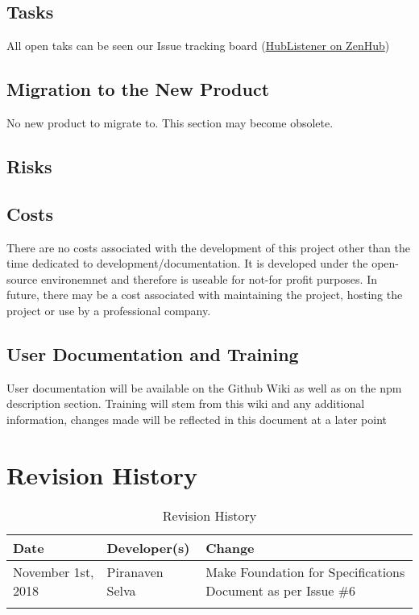 \documentclass{article}
\begin{document}
\subsection{Tasks}
All open taks can be seen our Issue tracking board (\href{ https://app.zenhub.com/workspaces/hublistener-5bad6c4d4b5806bc2bea488f/boards?repos=150634456}{HubListener on ZenHub})
\subsection{Migration to the New Product}

No new product to migrate to. This section may become obsolete. 

\subsection{Risks}
\subsection{Costs}

There are no costs associated with the development of this project other than the time dedicated to development/documentation. It is developed under the open-source environemnet and therefore is useable for not-for profit purposes.   In future, there may be a cost associated with maintaining the project, hosting the project or use by a professional company.  

\subsection{User Documentation and Training}

User documentation will be available on the Github Wiki as well as on the npm description section. 
\newline
Training will stem from this wiki and any additional information, changes made will be reflected in this document at a later point


\newpage
\section{Revision History}
\begin{table}[hp]
\caption{Revision History} \label{TblRevisionHistory}
\begin{tabularx}{\textwidth}{llX}
\toprule
\textbf{Date} & \textbf{Developer(s)} & \textbf{Change}\\
\midrule
November 1st, 2018 &Piranaven Selva & Make Foundation for Specifications Document as per Issue \#6 \\
\\
\bottomrule
\end{tabularx}
\end{table}
\end{document}
